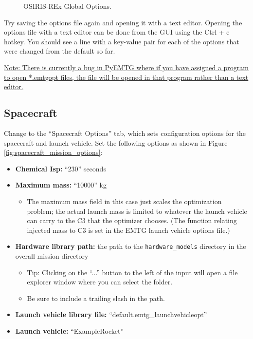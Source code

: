 \documentclass[11pt]{article}
\makeatletter
\newcommand{\knownissuelabel}[2]
{
	 \phantomsection
  	\hyperref[#2_h]{#1}\def\@currentlabel{\unexpanded{#1}}\label{#2_b}
}
\makeatother
\begin{document}
\begin{figure}[H]
	\centering
	\caption{\label{fig:global_mission_options}OSIRIS-REx Global Options.}
\end{figure}

\noindent Try saving the options file again and opening it with a text editor. Opening the options file with a text editor can be done from the \ac{GUI} using the Ctrl + e hotkey. You should see a line with a key-value pair for each of the options that were changed from the default so far.

\noindent \knownissuelabel{Note: There is currently a bug in PyEMTG where if you have assigned a program to open *.emtgopt files, the file will be opened in that program rather than a text editor.}{text_editor_issue} 

\subsection{Spacecraft}
\label{sec:spacecraft}

Change to the ``Spacecraft Options'' tab, which sets configuration options for the spacecraft and launch vehicle. Set the following options as shown in Figure \ref{fig:spacecraft_mission_options}:

\begin{itemize}
	\item \textbf{Chemical Isp:} ``230'' seconds
	\item \textbf{Maximum mass:} ``10000'' kg
	\begin{itemize}
		\item  The maximum mass field in this case just scales the optimization problem; the actual launch mass is limited to whatever the launch vehicle can carry to the C3 that the optimizer chooses. (The function relating injected mass to C3 is set in the \ac{EMTG} launch vehicle options file.)
	\end{itemize}
	\item \textbf{Hardware library path:} the path to the \texttt{hardware\_models} directory in the overall mission directory
	\begin{itemize}
		\item Tip: Clicking on the ``...'' button to the left of the input will open a file explorer window where you can select the folder. 
		\item Be sure to include a trailing slash in the path.
	\end{itemize}
	\item \textbf{Launch vehicle library file:} ``default.emtg\_launchvehicleopt''
	\item \textbf{Launch vehicle:} ``ExampleRocket''
\end{itemize}
\end{document}
